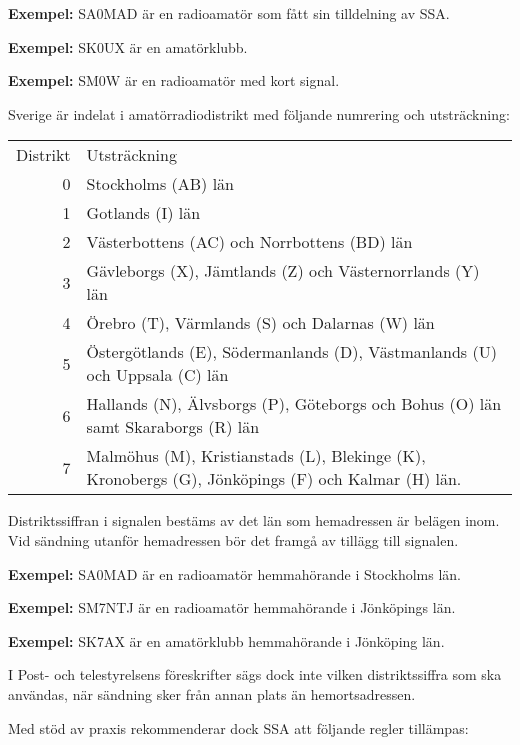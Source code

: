 \textbf{Exempel:} SA0MAD är en radioamatör som fått sin tilldelning av SSA.

\textbf{Exempel:} SK0UX är en amatörklubb.

\textbf{Exempel:} SM0W är en radioamatör med kort signal.

Sverige är indelat i amatörradiodistrikt med följande numrering och
utsträckning:

\begin{tabular}{rp{10cm}}
Distrikt & Utsträckning \\
0 & Stockholms (AB) län \\
1 & Gotlands (I) län \\
2 & Västerbottens (AC) och Norrbottens (BD) län \\
3 & Gävleborgs (X), Jämtlands (Z) och Västernorrlands (Y) län \\
4 & Örebro (T), Värmlands (S) och Dalarnas (W) län \\
5 & Östergötlands (E), Södermanlands (D), Västmanlands (U) och Uppsala (C) län\\
6 & Hallands (N), Älvsborgs (P), Göteborgs och Bohus (O) län samt Skaraborgs (R) län \\
7 & Malmöhus (M), Kristianstads (L), Blekinge (K), Kronobergs (G), Jönköpings (F) och Kalmar (H) län.\\
\end{tabular}

Distriktssiffran i signalen bestäms av det län som hemadressen är
belägen inom. Vid sändning utanför hemadressen bör det framgå av
tillägg till signalen.

\textbf{Exempel:} SA0MAD är en radioamatör hemmahörande i Stockholms län.

\textbf{Exempel:} SM7NTJ är en radioamatör hemmahörande i Jönköpings län.

\textbf{Exempel:} SK7AX är en amatörklubb hemmahörande i Jönköping län.

I Post- och telestyrelsens föreskrifter sägs dock inte vilken
distriktssiffra som ska användas, när sändning sker från annan plats
än hemortsadressen.

Med stöd av praxis rekommenderar dock SSA att följande regler
tillämpas:

